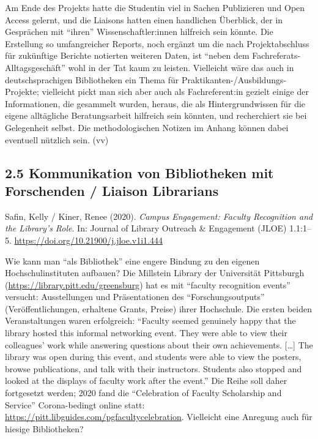 \documentclass[a4paper,
fontsize=11pt,
oneside,
numbers=noperiodatend,
parskip=half-,
bibliography=totoc,
final
]{scrartcl}
\begin{document}
Am Ende des Projekts hatte die Studentin viel in Sachen Publizieren und
Open Access gelernt, und die Liaisons hatten einen handlichen Überblick,
der in Gesprächen mit \enquote{ihren} Wissenschaftler:innen hilfreich
sein könnte. Die Erstellung so umfangreicher Reports, noch ergänzt um
die nach Projektabschluss für zukünftige Berichte notierten weiteren
Daten, ist \enquote{neben dem Fachreferats-Alltagsgeschäft} wohl in der
Tat kaum zu leisten. Vielleicht wäre das auch in deutschsprachigen
Bibliotheken ein Thema für Praktikanten-/Ausbildungs-Projekte;
vielleicht pickt man sich aber auch als Fachreferent:in gezielt einige
der Informationen, die gesammelt wurden, heraus, die als
Hintergrundwissen für die eigene alltägliche Beratungsarbeit hilfreich
sein könnten, und recherchiert sie bei Gelegenheit selbst. Die
methodologischen Notizen im Anhang können dabei eventuell nützlich sein.
(vv)

\hypertarget{kommunikation-von-bibliotheken-mit-forschenden-liaison-librarians}{%
\subsection{2.5 Kommunikation von Bibliotheken mit Forschenden / Liaison
Librarians}\label{kommunikation-von-bibliotheken-mit-forschenden-liaison-librarians}}

Safin, Kelly / Kiner, Renee (2020). \emph{Campus Engagement: Faculty
Recognition and the Library's Role}. In: Journal of Library Outreach \&
Engagement (JLOE) 1.1:1--5.
\url{https://doi.org/10.21900/j.jloe.v1i1.444}

Wie kann man \enquote{als Bibliothek} eine engere Bindung zu den eigenen
Hochschulinstituten aufbauen? Die Millstein Library der Universität
Pittsburgh (\url{https://library.pitt.edu/greensburg}) hat es mit
\enquote{faculty recognition events} versucht: Ausstellungen und
Präsentationen des \enquote{Forschungsoutputs} (Veröffentlichungen,
erhaltene Grants, Preise) ihrer Hochschule. Die ersten beiden
Veranstaltungen waren erfolgreich: \enquote{Faculty seemed genuinely
happy that the library hosted this informal networking event. They were
able to view their colleagues' work while answering questions about
their own achievements. {[}\ldots{]} The library was open during this
event, and students were able to view the posters, browse publications,
and talk with their instructors. Students also stopped and looked at the
displays of faculty work after the event.} Die Reihe soll daher
fortgesetzt werden; 2020 fand die \enquote{Celebration of Faculty
Scholarship and Service} Corona-bedingt online statt:
\url{https://pitt.libguides.com/pgfacultycelebration}. Vielleicht eine
Anregung auch für hiesige Bibliotheken?
\end{document}
